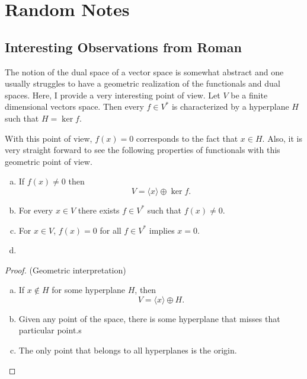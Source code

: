 \chapter{Random Notes}

\section{Interesting Observations from Roman}

\begin{observation}
	The notion of the dual space of a vector space is somewhat abstract and one usually struggles to have a geometric realization of the functionals and dual spaces. Here, I provide a very interesting point of view. Let $ V $  be a finite dimensional vectors space. Then every $ f \in V^* $ is characterized by a hyperplane $ H $ such that $ H = \operatorname{ker} f $. 
	
	\noindent With this point of view, $ f(x) = 0 $ corresponds to the fact that $ x \in  H $. Also, it is very straight forward to see the following properties of functionals with this geometric point of view.
	\begin{proposition}
		\begin{enumerate}[(a)]
			\item If $ f(x) \neq 0 $ then 
			\[ V = \langle x \rangle \oplus \ker f. \]
			\item For every $ x\in V $ there exists $ f \in V^* $ such that $ f(x) \neq 0 $.
			\item For $ x\in V $, $ f(x) = 0 $ for all $ f\in V^* $ implies $ x = 0 $.
			\item 
		\end{enumerate}
	\end{proposition}
	\begin{proof}(Geometric interpretation)
		\begin{enumerate}[(a)]
			\item If $ x\notin H $ for some hyperplane $ H $, then 
			\[ V = \langle x \rangle \oplus H. \]
			\item Given any point of the space, there is some hyperplane that misses that particular point.s
			\item The only point that belongs to all hyperplanes is the origin.
		\end{enumerate}
	\end{proof}
\end{observation}



